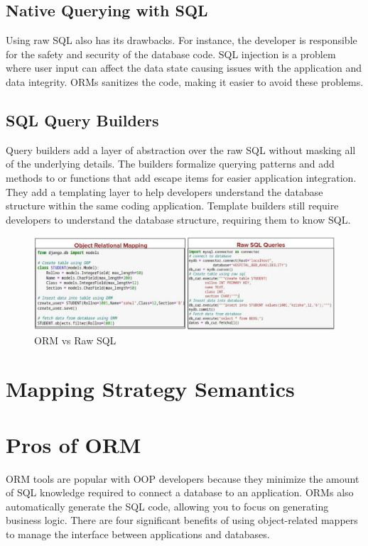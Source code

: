 \documentclass[10pt,a4paper,twoside]{article}
\begin{document}
\subsection{Native Querying with SQL}
\item Using raw SQL also has its drawbacks. For instance, the developer is responsible for the safety and security of the database code. SQL injection is a problem where user input can affect the data state causing issues with the application and data integrity. ORMs sanitizes the code, making it easier to avoid these problems.
\subsection{SQL Query Builders}
\item Query builders add a layer of abstraction over the raw SQL without masking all of the underlying details. The builders formalize querying patterns and add methods to or functions that add escape items for easier application integration. They add a templating layer to help developers understand the database structure within the same coding application. Template builders still require developers to understand the database structure, requiring them to know SQL.
\begin{figure}
  \includegraphics[width=\linewidth]{./images/orm2.JPG}
  \caption{ORM vs Raw SQL}
  \label{fig:ORM vs SQL}
\end{figure}


\section{Mapping Strategy Semantics}
\item


\section{Pros of ORM}
\item ORM tools are popular with OOP developers because they minimize the amount of SQL knowledge required to connect a database to an application. ORMs also automatically generate the SQL code, allowing you to focus on generating business logic. There are four significant benefits of using object-related mappers to manage the interface between applications and databases.
\end{document}
